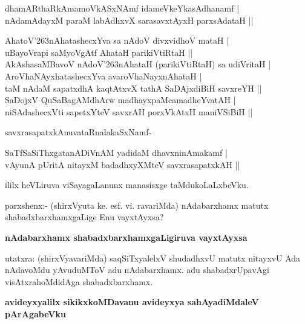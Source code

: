 \begin{shloka}
dhamARthaRkAmamoVkASxNAmf idameVkeYkasAdhanamf |\\\label{159b}
nAdamAdayxM paraM labAdhxvX sarasavxtAyxH parxsAdataH ||
\end{shloka}

\begin{shloka}
AhatoV\char'263nAhatashecxYva sa nAdoV divxvidhoV mataH |\\\label{159c}
uBayoVrapi saMyoVgAtf AhataH parikiVtiRtaH ||\\
AkAshasaMBavoV nAdoV\char'263nAhataH (parikiVtiRtaH) sa udiVritaH |\\
AroVhaNAyxhatashecxYva avaroVhaNayxnAhataH |\\
taM nAdaM sapatxdhA kaqtAtxvX tathA SaDAjxdiBiH savxreYH ||\\
SaDojxV QuSaBagAMdhArw madhayxpaMcamadheYvatAH |\\
niSAdashecxVti sapetxYteV savxrAH porxVkAtxH maniVSiBiH ||
\end{shloka}

\noindent
savxrasapatxkAnuvataRnalakaSxNamf-\label{160a}

\begin{shloka}
SaTfSaSiThxgatanADiVnAM yadidaM dhavxninAmakamf |\\
vAyunA pUritA nitayxM badadhxyXMteV savxrasapatxkAH ||
\end{shloka}

\noindent
ililx heVLiruva viSayagaLanunx manasisxge taMdukoLaLxbeVku.

parxshenx:- (shirxVyuta ke. esf. vi. ravariMda) nAdabarxhamx matutx shabadxbarxhamxgaLige Enu vayxtAyxsa?

{\bigskip
\noindent
{\large\bf nAdabarxhamx shabadxbarxhamxgaLigiruva vayxtAyxsa}}\label{160b}
\medskip

\noindent
utatxra: (shirxVyavariMda) saqSiTxyalelxV shudadhxvU matutx nitayxvU Ada nAdavoMdu yAvuduMToV adu nAdabarxhamx. adu shabadxrUpavAgi visAtxrahoMdidAga shabadxbarxhamx.

{\bigskip
\noindent
{\large\bf avideyxyalilx sikikxkoMDavanu avideyxya sahAyadiMdaleV pArAgabeVku}}\label{page160}
\medskip

